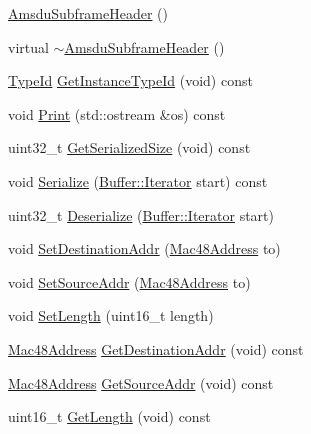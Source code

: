 \begin{DoxyCompactItemize}
\item 
\hyperlink{classns3_1_1AmsduSubframeHeader_a2040b68180cc1cab985cb129640b2d3b}{Amsdu\+Subframe\+Header} ()
\item 
virtual \hyperlink{classns3_1_1AmsduSubframeHeader_ad0321cab9f8c91ff57f137ca5e518223}{$\sim$\+Amsdu\+Subframe\+Header} ()
\item 
\hyperlink{classns3_1_1TypeId}{Type\+Id} \hyperlink{classns3_1_1AmsduSubframeHeader_ab6ea2ab7f60dd2c4de0e82c410474d00}{Get\+Instance\+Type\+Id} (void) const 
\item 
void \hyperlink{classns3_1_1AmsduSubframeHeader_afb2d3de2a285ebecf823b6846d51ec4d}{Print} (std\+::ostream \&os) const 
\item 
uint32\+\_\+t \hyperlink{classns3_1_1AmsduSubframeHeader_abb3add1a83090ed24ac6796a0706f00c}{Get\+Serialized\+Size} (void) const 
\item 
void \hyperlink{classns3_1_1AmsduSubframeHeader_ad875e6109121c47eb83c4af1ea6bcb03}{Serialize} (\hyperlink{classns3_1_1Buffer_1_1Iterator}{Buffer\+::\+Iterator} start) const 
\item 
uint32\+\_\+t \hyperlink{classns3_1_1AmsduSubframeHeader_a9b093c3b2ef78c73c62b9497f35809e2}{Deserialize} (\hyperlink{classns3_1_1Buffer_1_1Iterator}{Buffer\+::\+Iterator} start)
\item 
void \hyperlink{classns3_1_1AmsduSubframeHeader_a56b2757086174fdb495b20c7126557ea}{Set\+Destination\+Addr} (\hyperlink{classns3_1_1Mac48Address}{Mac48\+Address} to)
\item 
void \hyperlink{classns3_1_1AmsduSubframeHeader_a1077b9b9a3b198e54740bb7078a6624f}{Set\+Source\+Addr} (\hyperlink{classns3_1_1Mac48Address}{Mac48\+Address} to)
\item 
void \hyperlink{classns3_1_1AmsduSubframeHeader_a7f4720d133f51cafea5f60aabbd999a9}{Set\+Length} (uint16\+\_\+t length)
\item 
\hyperlink{classns3_1_1Mac48Address}{Mac48\+Address} \hyperlink{classns3_1_1AmsduSubframeHeader_adacdd4ba4032f5d9b2c1cd5b8bf8e4d6}{Get\+Destination\+Addr} (void) const 
\item 
\hyperlink{classns3_1_1Mac48Address}{Mac48\+Address} \hyperlink{classns3_1_1AmsduSubframeHeader_a0b13a6770c4c38cdfab9a083b413e79b}{Get\+Source\+Addr} (void) const 
\item 
uint16\+\_\+t \hyperlink{classns3_1_1AmsduSubframeHeader_a5411fb0d11244fbcf5acdb26ef77219c}{Get\+Length} (void) const 
\end{DoxyCompactItemize}
